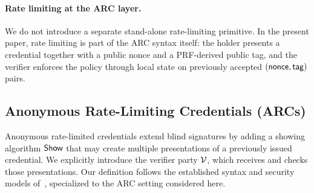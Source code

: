 \paragraph{Rate limiting at the ARC layer.}
We do not introduce a separate stand-alone rate-limiting primitive. In the present paper, rate limiting is part of the
ARC syntax itself: the holder presents a credential together with a public nonce and a PRF-derived public tag, and the
verifier enforces the policy through local state on previously accepted \((\mathsf{nonce},\mathsf{tag})\) pairs.


\subsection{Anonymous Rate-Limiting Credentials (ARCs)}
\label{subsec:arc-security}
Anonymous rate-limited credentials extend blind signatures by adding a showing algorithm \(\mathsf{Show}\) that may create
multiple presentations of a previously issued credential. We explicitly introduce the verifier party \(\mathcal{V}\),
which receives and checks those presentations. Our definition follows the established syntax and security models
of~\cite{JC:FucHanSla19,C:BLNS23}, specialized to the ARC setting considered here.

